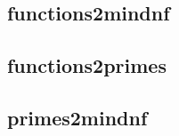 \documentclass[letterpaper,10pt,english]{sphinxmanual}
\begin{document}
\subsection{functions2mindnf}
\label{\detokenize{QuineMcCluskey:id2}}\label{\detokenize{QuineMcCluskey:functions2mindnf}}

\subsection{functions2primes}
\label{\detokenize{QuineMcCluskey:id3}}\label{\detokenize{QuineMcCluskey:functions2primes}}

\subsection{primes2mindnf}
\label{\detokenize{QuineMcCluskey:id4}}\label{\detokenize{QuineMcCluskey:primes2mindnf}}
\end{document}
